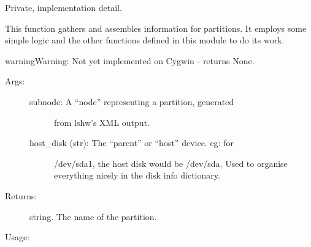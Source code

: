 \documentclass[letterpaper,10pt,english]{sphinxmanual}
\begin{document}
\begin{fulllineitems}
\label{\detokenize{cygwin:getdevinfo.cygwin.get_partition_info}}
Private, implementation detail.

This function gathers and assembles information for partitions.
It employs some simple logic and the other functions defined in this
module to do its work.

\begin{sphinxadmonition}{warning}{Warning:}
Not yet implemented on Cygwin - returns None.
\end{sphinxadmonition}
\begin{description}
\item[{Args:}] \leavevmode\begin{description}
\item[{subnode:            A “node” representing a partition, generated}] \leavevmode
from lshw’s XML output.

\item[{host\_disk (str):    The “parent” or “host” device. eg: for}] \leavevmode
/dev/sda1, the host disk would be /dev/sda.
Used to organise everything nicely in the
disk info dictionary.

\end{description}

\item[{Returns:}] \leavevmode
string.     The name of the partition.

\end{description}

Usage:

\begin{sphinxVerbatim}[commandchars=\\\{\}]
  
\end{sphinxVerbatim}

\end{fulllineitems}

\end{document}
